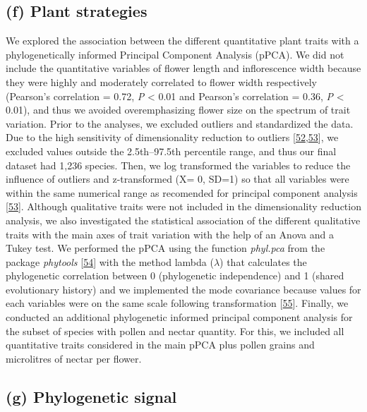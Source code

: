 \documentclass[
  12pt,
  a4paper,
]{article}
\begin{document}
\hypertarget{f-plant-strategies}{%
\subsection{(f) Plant strategies}\label{f-plant-strategies}}

We explored the association between the different quantitative plant traits with a phylogenetically informed Principal Component Analysis (pPCA). We did not include the quantitative variables of flower length and inflorescence width because they were highly and moderately correlated to flower width respectively (Pearson's correlation = 0.72, \emph{P} \textless{} 0.01 and Pearson's correlation = 0.36, \emph{P} \textless{} 0.01), and thus we avoided overemphasizing flower size on the spectrum of trait variation. Prior to the analyses, we excluded outliers and standardized the data. Due to the high sensitivity of dimensionality reduction to outliers {[}\protect\hyperlink{ref-serneels2008}{52},\protect\hyperlink{ref-legendre2012}{53}{]}, we excluded values outside the 2.5th--97.5th percentile range, and thus our final dataset had 1,236 species. Then, we log transformed the variables to reduce the influence of outliers and z-transformed (X= 0, SD=1) so that all variables were within the same numerical range as recomended for principal component analysis {[}\protect\hyperlink{ref-legendre2012}{53}{]}. Although qualitative traits were not included in the dimensionality reduction analysis, we also investigated the statistical association of the different qualitative traits with the main axes of trait variation with the help of an Anova and a Tukey test. We performed the pPCA using the function \emph{phyl.pca} from the package \emph{phytools} {[}\protect\hyperlink{ref-revell2012}{54}{]} with the method lambda (\(\lambda\)) that calculates the phylogenetic correlation between 0 (phylogenetic independence) and 1 (shared evolutionary history) and we implemented the mode covariance because values for each variables were on the same scale following transformation {[}\protect\hyperlink{ref-abdi2010}{55}{]}. Finally, we conducted an additional phylogenetic informed principal component analysis for the subset of species with pollen and nectar quantity. For this, we included all quantitative traits considered in the main pPCA plus pollen grains and microlitres of nectar per flower.

\hypertarget{g-phylogenetic-signal}{%
\subsection{(g) Phylogenetic signal}\label{g-phylogenetic-signal}}
\end{document}
